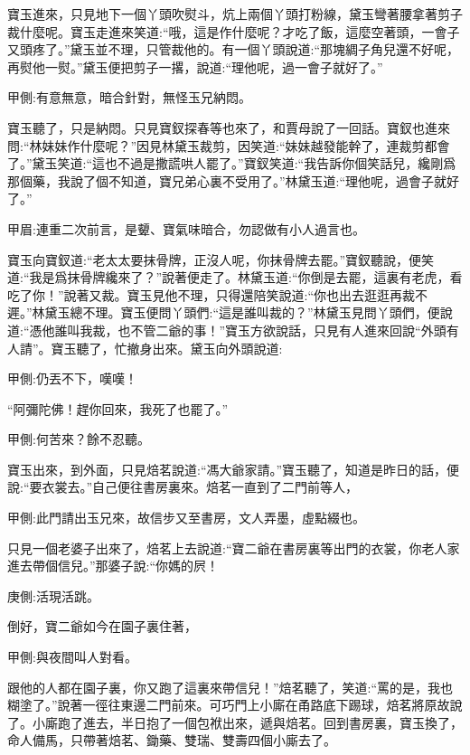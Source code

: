 \begin{parag}
    寶玉進來，只見地下一個丫頭吹熨斗，炕上兩個丫頭打粉線，黛玉彎著腰拿著剪子裁什麼呢。寶玉走進來笑道:“哦，這是作什麼呢？才吃了飯，這麼空著頭，一會子又頭疼了。”黛玉並不理，只管裁他的。有一個丫頭說道:“那塊綢子角兒還不好呢，再熨他一熨。”黛玉便把剪子一撂，說道:“理他呢，過一會子就好了。”\begin{note}甲側:有意無意，暗合針對，無怪玉兄納悶。\end{note}寶玉聽了，只是納悶。只見寶釵探春等也來了，和賈母說了一回話。寶釵也進來問:“林妹妹作什麼呢？”因見林黛玉裁剪，因笑道:“妹妹越發能幹了，連裁剪都會了。”黛玉笑道:“這也不過是撒謊哄人罷了。”寶釵笑道:“我告訴你個笑話兒，纔剛爲那個藥，我說了個不知道，寶兄弟心裏不受用了。”林黛玉道:“理他呢，過會子就好了。”\begin{note}甲眉:連重二次前言，是顰、寶氣味暗合，勿認做有小人過言也。\end{note}寶玉向寶釵道:“老太太要抹骨牌，正沒人呢，你抹骨牌去罷。”寶釵聽說，便笑道:“我是爲抹骨牌纔來了？”說著便走了。林黛玉道:“你倒是去罷，這裏有老虎，看吃了你！”說著又裁。寶玉見他不理，只得還陪笑說道:“你也出去逛逛再裁不遲。”林黛玉總不理。寶玉便問丫頭們:“這是誰叫裁的？”林黛玉見問丫頭們，便說道:“憑他誰叫我裁，也不管二爺的事！”寶玉方欲說話，只見有人進來回說“外頭有人請”。寶玉聽了，忙撤身出來。黛玉向外頭說道:\begin{note}甲側:仍丟不下，嘆嘆！\end{note}“阿彌陀佛！趕你回來，我死了也罷了。”\begin{note}甲側:何苦來？餘不忍聽。\end{note}
\end{parag}


\begin{parag}
    寶玉出來，到外面，只見焙茗說道:“馮大爺家請。”寶玉聽了，知道是昨日的話，便說:“要衣裳去。”自己便往書房裏來。焙茗一直到了二門前等人，\begin{note}甲側:此門請出玉兄來，故信步又至書房，文人弄墨，虛點綴也。\end{note}只見一個老婆子出來了，焙茗上去說道:“寶二爺在書房裏等出門的衣裳，你老人家進去帶個信兒。”那婆子說:“你媽的屄！\begin{note}庚側:活現活跳。\end{note}倒好，寶二爺如今在園子裏住著，\begin{note}甲側:與夜間叫人對看。\end{note}跟他的人都在園子裏，你又跑了這裏來帶信兒！”焙茗聽了，笑道:“罵的是，我也糊塗了。”說著一徑往東邊二門前來。可巧門上小廝在甬路底下踢球，焙茗將原故說了。小廝跑了進去，半日抱了一個包袱出來，遞與焙茗。回到書房裏，寶玉換了，命人備馬，只帶著焙茗、鋤藥、雙瑞、雙壽四個小廝去了。
\end{parag}


